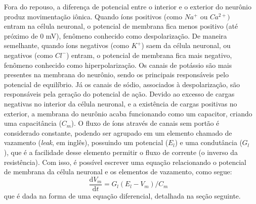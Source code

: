 \begin{table}
\end{table}

Fora do repouso, a diferença de potencial entre o interior e o exterior do neurônio produz movimentação iônica. Quando íons positivos (como $Na^+$ ou $Ca^{2+})$ entram na célula neuronal, o potencial de membrana fica menos positivo (até próximo de 0 mV), fenômeno conhecido como despolarização. De maneira semelhante, quando íons negativos (como $K^+$) saem da célula neuronal, ou negativos (como $Cl^-$) entram, o potencial de membrana fica mais negativo, fenômeno conhecido como hiperpolarização. Os canais de potássio são mais presentes na membrana do neurônio, sendo os principais responsáveis pelo potencial de equilíbrio. Já os canais de sódio, associados à despolarização, são responsáveis pela geração do potencial de ação. Devido ao excesso de cargas negativas no interior da célula neuronal, e a existência de cargas positivas no exterior, a membrana do neurônio acaba funcionando como um capacitor, criando uma capacitância ($C_m$). O fluxo de íons através de canais sem portão é considerado constante, podendo ser agrupado em um elemento chamado de vazamento (\textit{leak}, em inglês), possuindo um potencial ($E_l$) e uma condutância ($G_l$), que é a facilidade desse elemento permitir o fluxo de corrente (o inverso da resistência). Com isso, é possível escrever uma equação relacionando o potencial de membrana da célula neuronal e os elementos de vazamento, como segue:
\begin{equation}\label{eq:potencial_membrana}
	\frac{\mathrm{d}V_m}{\mathrm{d}t}=G_l(E_l-V_m)/C_m
\end{equation}
que é dada na forma de uma equação diferencial, detalhada na seção seguinte.

